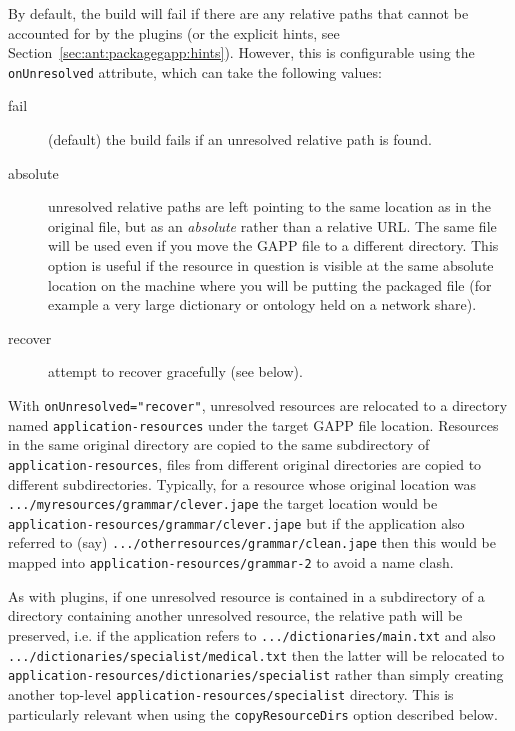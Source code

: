 By default, the build will fail if there are any relative paths that cannot be
accounted for by the plugins (or the explicit hints, see
Section~\ref{sec:ant:packagegapp:hints}).
However, this is configurable using the \texttt{onUnresolved} attribute, which can
take the following values:

\begin{description}
\item[fail] (default) the build fails if an unresolved relative path is found.
\item[absolute] unresolved relative paths are left pointing to the same location
  as in the original file, but as an \emph{absolute} rather than a relative URL.
  The same file will be used even if you move the GAPP file to a different
  directory.  This option is useful if the resource in question is visible at
  the same absolute location on the machine where you will be putting the
  packaged file (for example a very large dictionary or ontology held on a
  network share).
\item[recover] attempt to recover gracefully (see below).
\end{description}

With \verb|onUnresolved="recover"|, unresolved resources are relocated to a
directory named \texttt{application-resources} under the target GAPP file
location.  Resources in the same original directory are copied to the same
subdirectory of \texttt{application-resources}, files from different original
directories are copied to different subdirectories.  Typically, for a resource
whose original location was \texttt{.../myresources/grammar/clever.jape} the
target location would be \texttt{application-resources/grammar/clever.jape} but
if the application also referred to (say)
\texttt{.../otherresources/grammar/clean.jape} then this would be
mapped into \texttt{application-resources/grammar-2} to avoid a name clash.

As with plugins, if one unresolved resource is contained in a subdirectory of a
directory containing another unresolved resource, the relative path will be
preserved, i.e. if the application refers to \texttt{.../dictionaries/main.txt}
and also \texttt{.../dictionaries/specialist/medical.txt} then the latter will
be relocated to \texttt{application-resources/dictionaries/specialist} rather
than simply creating another top-level
\texttt{application-resources/specialist} directory.  This is particularly
relevant when using the \texttt{copyResourceDirs} option described below.

